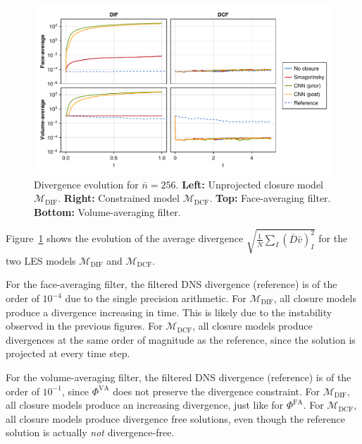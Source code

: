 \documentclass[preprint]{elsarticle}
\newcommand{\revboth}[1]{#1}
\begin{document}
\begin{figure}
    \centering
    \includegraphics[width=\textwidth]{figures_kolmogorov_divergence_nles=256.pdf}
    \caption{Divergence evolution for
        \revboth{ $\bar{n} = 256$}.
        \textbf{Left:} Unprojected closure model $\mathcal{M}_{\text{DIF}}$.
        \textbf{Right:} Constrained model $\mathcal{M}_{\text{DCF}}$.
        \textbf{Top:} Face-averaging filter. \textbf{Bottom:}
        Volume-averaging filter.
    }
    \label{fig:divergence_evolution}
\end{figure}

Figure~\ref{fig:divergence_evolution} shows the evolution of the average
divergence $\sqrt{\frac{1}{\bar{N}} \sum_I (\bar{D} \bar{v})_I^2}$ for the
two LES models
$\mathcal{M}_{\text{DIF}}$ and
$\mathcal{M}_{\text{DCF}}$.

For the face-averaging filter, the filtered DNS divergence (reference) is of the
order of
\revboth{ $10^{-4}$}
due to the single precision arithmetic. For $\mathcal{M}_{\text{DIF}}$,
all closure models produce a divergence increasing
in time. This is likely due to the instability observed in the previous
figures.
For $\mathcal{M}_{\text{DCF}}$, all closure models produce divergences at the same
order of magnitude as the reference, since the solution is projected at every
time step.

For the volume-averaging filter, the filtered DNS divergence (reference) is of
the order of \revboth{ $10^{-1}$}, since $\Phi^\text{VA}$ does not
preserve the divergence constraint. For $\mathcal{M}_{\text{DIF}}$, all closure models
produce an increasing divergence, just like for $\Phi^\text{FA}$.
For $\mathcal{M}_{\text{DCF}}$, all closure models produce divergence free solutions,
even though the reference solution is actually \emph{not} divergence-free.
\end{document}
